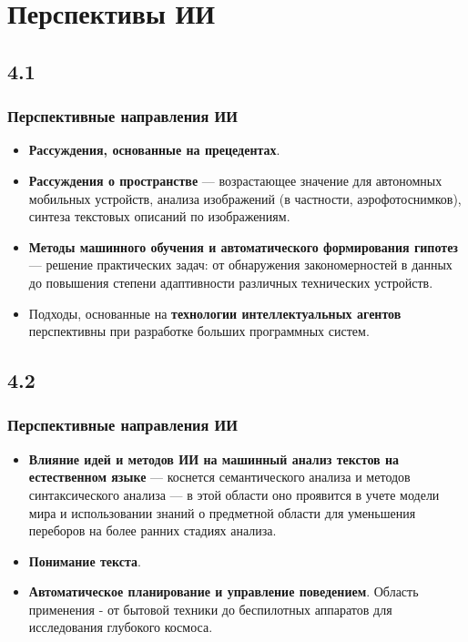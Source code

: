 \documentclass[default]{beamer}
\begin{document}
	\section{Перспективы ИИ}
	\subsection{4.1}
	\begin{frame}
		\frametitle{Перспективные направления ИИ}
		
		\begin{itemize}
			\item \textbf{Рассуждения, основанные на прецедентах}.
			\item \textbf{Рассуждения о пространстве} --- возрастающее значение для автономных мобильных устройств, анализа изображений (в частности, аэрофотоснимков), синтеза текстовых описаний по изображениям.
			\item \textbf{Методы машинного обучения и автоматического формирования гипотез} --- решение практических задач: от обнаружения  закономерностей в данных до повышения степени адаптивности различных технических устройств.
			\item Подходы, основанные на \textbf{технологии интеллектуальных агентов} перспективны при разработке больших программных систем.
			
		\end{itemize}
		
	\end{frame}

	\subsection{4.2}
	\begin{frame}
		\frametitle{Перспективные направления ИИ}
		
		\begin{itemize}
			\item \textbf{Влияние идей и методов ИИ на машинный анализ текстов на естественном языке} --- коснется  семантического анализа и методов синтаксического анализа --- в этой области оно проявится в учете модели мира и использовании знаний о предметной области  для уменьшения переборов  на более ранних стадиях анализа.
			\item \textbf{Понимание текста}.
			\item \textbf{Автоматическое планирование и управление поведением}. Область применения  - от бытовой  техники до беспилотных аппаратов для исследования глубокого космоса.
		\end{itemize}
		
	\end{frame}
\end{document}
